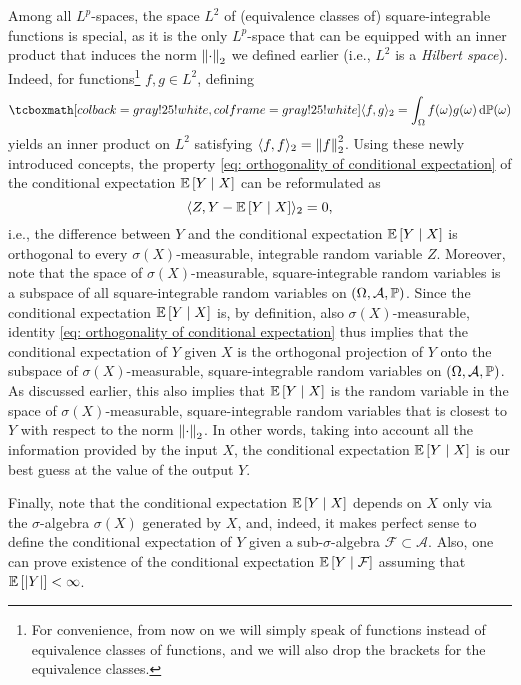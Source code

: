 Among all $L^p$-spaces, the space $L^2$ of (equivalence classes of) square-integrable functions is special, as it is the only $L^p$-space that can be equipped with an inner product that induces the norm $\norm{\cdot}_2$ we defined earlier (i.e., $L^2$ is a \emph{Hilbert space}). Indeed, for functions\footnote{For convenience, from now on we will simply speak of functions instead of equivalence classes of functions, and we will also drop the brackets for the equivalence classes.} $f, g \in L^2$, defining
\[
    \highlightMath{
        \langle f, g \rangle_2 = \int_{\Omega} f(\omega) g(\omega) \, \mathrm{d}\P(\omega)
    }
\]
yields an inner product on $L^2$ satisfying $\langle f, f \rangle_2 = \norm{f}^2_2$. Using these newly introduced concepts, the property \eqref{eq: orthogonality of conditional expectation} of the conditional expectation $\Ex{Y \given X}$ can be reformulated as
\[
    \langle Z, Y - \Ex{Y \given X} \rangle_2 = 0,
\]
i.e., the difference between $Y$ and the conditional expectation $\Ex{Y \given X}$ is orthogonal to every $\sigma(X)$-measurable, integrable random variable $Z$. Moreover, note that the space of $\sigma(X)$-measurable, square-integrable random variables is a subspace of all square-integrable random variables on $(\Omega, \mathcal{A}, \P)$. Since the conditional expectation $\Ex{Y \given X}$ is, by definition, also $\sigma(X)$-measurable, identity \eqref{eq: orthogonality of conditional expectation} thus implies that the conditional expectation of $Y$ given $X$ is the orthogonal projection of $Y$ onto the subspace of $\sigma(X)$-measurable, square-integrable random variables on $(\Omega, \mathcal{A}, \P)$. As discussed earlier, this also implies that $\Ex{Y \given X}$ is the random variable in the space of $\sigma(X)$-measurable, square-integrable random variables that is closest to $Y$ with respect to the norm $\norm{\cdot}_2$. In other words, taking into account all the information provided by the input $X$, the conditional expectation $\Ex{Y \given X}$ is our best guess at the value of the output $Y$.

Finally, note that the conditional expectation $\Ex{Y \given X}$ depends on $X$ only via the $\sigma$-algebra $\sigma(X)$ generated by $X$, and, indeed, it makes perfect sense to define the conditional expectation of $Y$ given a sub-$\sigma$-algebra $\mathcal{F} \subset \mathcal{A}$. Also, one can prove existence of the conditional expectation $\Ex{Y \given \mathcal{F}}$ assuming that $\Ex{\abs{Y}} < \infty$.

